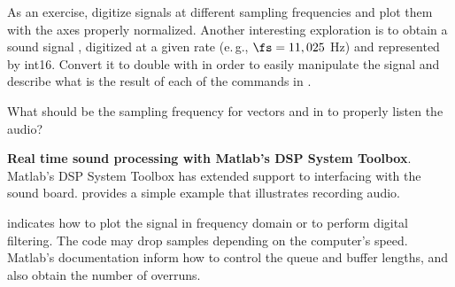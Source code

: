 As an exercise, digitize signals at different sampling frequencies and plot them with the axes properly normalized.
Another interesting exploration is to obtain a sound signal , digitized at a given rate (e.\,g., $\fs=11,025$ Hz) and represented by int16. Convert it to double with  in order to easily manipulate the signal and describe what is the result of each of the commands in .


What should be the sampling frequency for vectors  and  in  to properly listen the audio?
\eApplication

\bApplication \textbf{Real time sound processing with Matlab's DSP System Toolbox}.
Matlab's DSP System Toolbox has extended support to interfacing with the
sound board.  provides a simple example
that illustrates recording audio.



 indicates how to plot the signal
in frequency domain or to perform digital filtering. The code may drop samples
depending on the computer's speed. Matlab's documentation inform how to control
the queue and buffer lengths, and also obtain the number of overruns.
\eApplication

